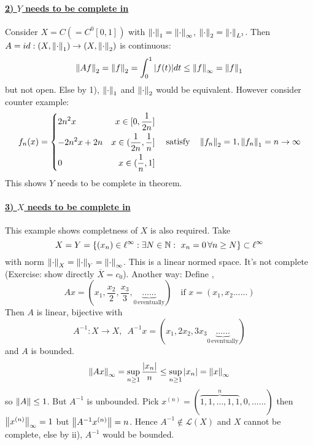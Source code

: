 \documentclass{article}
\begin{document}
\paragraph{\underline{\textbf{2) $Y$ needs to be complete in }}}
\begin{example}[Completeness of $Y$]\nl
Consider $X=C(=C^0[0,1])$ with $\left\|{\cdot}\right\|_1=\left\|{\cdot}\right\|_\infty$, $\left\|{\cdot}\right\|_2=\left\|{\cdot}\right\|_{L^1}$. Then $A=id:(X,\left\|{\cdot}\right\|_1)\to(X,\left\|{\cdot}\right\|_2)$ is continuous:
$$
\left\|{Af}\right\|_2
=\left\|{f}\right\|_2
=\int_0^1|f(t)|dt
\leq\left\|{f}\right\|_\infty
=\left\|{f}\right\|_1
$$
but not open. Else by 1),  $\left\|{\cdot}\right\|_1$ and $\left\|{\cdot}\right\|_2$ would be equivalent. However consider counter example:
\begin{equation}\nonumber
f_n(x)=\left\{
\begin{aligned}
    &{2n^2x} &x\in[0,\frac{1}{2n}]\\
    &{-2n^2x+2n} &x\in(\frac{1}{2n},\frac{1}{n}]\\
    &0 &x\in(\frac{1}{n},1]\\
\end{aligned}
\right.\quad\text{satisfy}\quad\left\|{f_n}\right\|_2=1,\left\|{f_n}\right\|_1=n\to\infty
\end{equation}
This shows $Y$ needs to be complete in theorem.
\end{example}

\paragraph{\underline{\textbf{3) $X$ needs to be complete in }}}
\begin{example}[Completeness of $X$]\nl
This example shows completness of $X$ is also required.
Take 
$$
X=Y=\{(x_n)\in\ell^\infty:\exists N \in \natu: \ x_n=0\,\forall n\geq N\}\subset\ell^\infty
$$
with norm $\left\|{\cdot}\right\|_X=\left\|{\cdot}\right\|_Y=\left\|{\cdot}\right\|_\infty$. This is a linear normed space. It's not complete (Exercise: show directly $\overline{X}=c_0$). Another way:
Define , 
$$
Ax=(x_1,\frac{x_2}{2},\frac{x_3}{3},\underbrace{......}_{0\,\text{eventually}})\quad \text{if} \,\,x=(x_1,x_2......)
$$
Then $A$ is linear, bijective with 
$$
A^{-1}:X\to X, \,\,\,A^{-1}x=(x_1,2x_2,3x_3\underbrace{......}_{0\,\text{eventually}})
$$
and $A$ is bounded. 
$$
\left\|{Ax}\right\|_\infty=\sup_{n\geq1}\frac{|x_n|}{n}\leq\sup_{n\geq1}|x_n|=\left\|{x}\right\|_\infty
$$
so $\left\|{A}\right\|\leq1$. But $A^{-1}$ is unbounded. 
Pick $x^{(n)}=(\overbrace{1,1,\ldots, 1,1}^{n},0,......)$ then $\left\|{x^{(n)}}\right\|_\infty=1$ but $\left\|{A^{-1}x^{(n)}}\right\|=n$. Hence $A^{-1}\not\in\mathcal{L}(X)$ and $X$ cannot be complete, else by  ii), $A^{-1}$ would be bounded.
\end{example}
\end{document}
